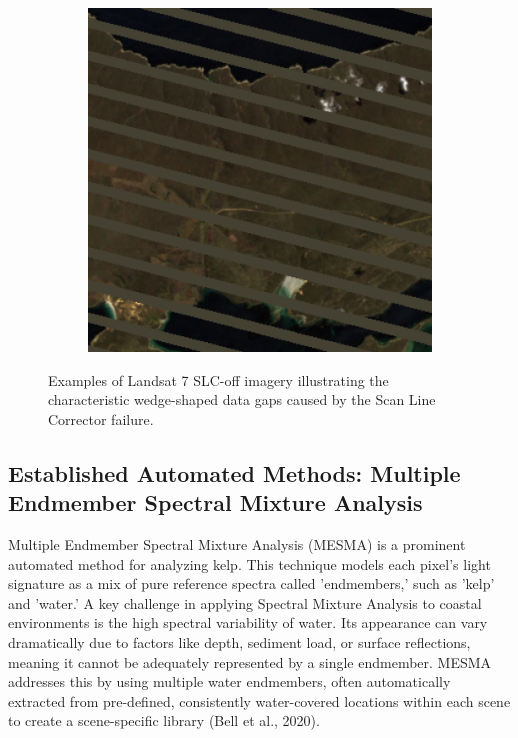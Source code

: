 \documentclass{article}
\begin{document}
\begin{figure}[htbp]
\begin{subfigure}[b]{0.3\textwidth}
      \label{fig:slc2}
  \end{subfigure}
  \hfill %
  \begin{subfigure}[b]{0.3\textwidth}
      \includegraphics[width=\textwidth]{slc_image3.png} %
      \label{fig:slc3}
  \end{subfigure}
  \caption{Examples of Landsat 7 SLC-off imagery illustrating the characteristic wedge-shaped data gaps caused by the Scan Line Corrector failure.}
  \label{fig:slc_failure_examples}
\end{figure}

\subsection{Established Automated Methods: Multiple Endmember Spectral Mixture Analysis} 

Multiple Endmember Spectral Mixture Analysis (MESMA) is a prominent automated method for analyzing kelp. This technique models each pixel's light signature as a mix of pure reference spectra called 'endmembers,' such as 'kelp' and 'water.' A key challenge in applying Spectral Mixture Analysis to coastal environments is the high spectral variability of water. Its appearance can vary dramatically due to factors like depth, sediment load, or surface reflections, meaning it cannot be adequately represented by a single endmember. MESMA addresses this by using multiple water endmembers, often automatically extracted from pre-defined, consistently water-covered locations within each scene to create a scene-specific library (Bell et al., 2020).
    
\end{document}

